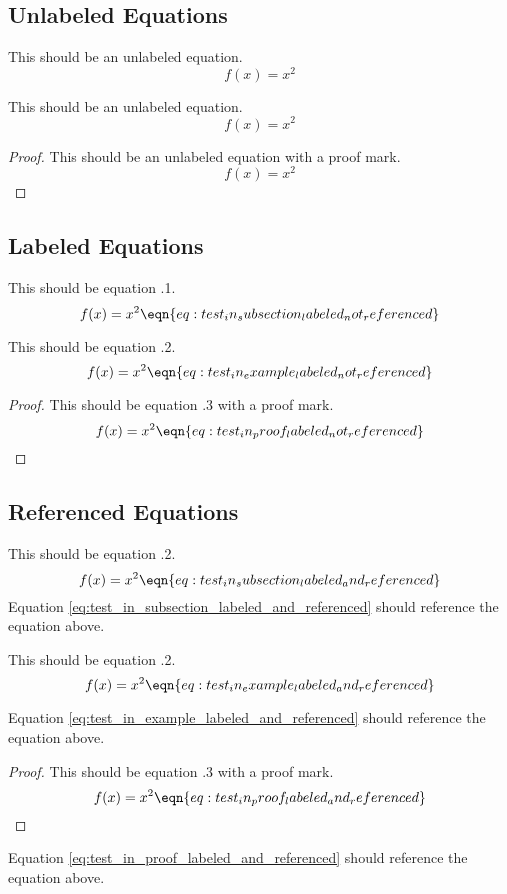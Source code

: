 \subsection{Unlabeled Equations}

This should be an unlabeled equation.
\[ f(x) = x^2 \]

\begin{theorem}
    This should be an unlabeled equation.
    \[ f(x) = x^2 \]
\end{theorem}

\begin{proof}
    This should be an unlabeled equation with a proof mark.
    \[ f(x) = x^2 \]
\end{proof}

\subsection{Labeled Equations}

This should be equation \thesubsection.1.
\[ f(x) = x^2 \eqn{eq:test_in_subsection_labeled_not_referenced} \]

\begin{example}
    This should be equation \thesubsection.2.
    \[ f(x) = x^2 \eqn{eq:test_in_example_labeled_not_referenced} \]
\end{example}

\begin{proof}
    This should be equation \thesubsection.3 with a proof mark.
    \[ f(x) = x^2 \eqn{eq:test_in_proof_labeled_not_referenced} \]
\end{proof}

\subsection{Referenced Equations}

This should be equation \thesubsection.2.
\[ f(x) = x^2 \eqn{eq:test_in_subsection_labeled_and_referenced} \]
Equation \eqref{eq:test_in_subsection_labeled_and_referenced} should reference the equation above.

\begin{example}
    This should be equation \thesubsection.2.
    \[ f(x) = x^2 \eqn{eq:test_in_example_labeled_and_referenced} \]
\end{example}
Equation \eqref{eq:test_in_example_labeled_and_referenced} should reference the equation above.

\begin{proof}
    This should be equation \thesubsection.3 with a proof mark.
    \[ f(x) = x^2 \eqn{eq:test_in_proof_labeled_and_referenced} \]
\end{proof}
Equation \eqref{eq:test_in_proof_labeled_and_referenced} should reference the equation above.
